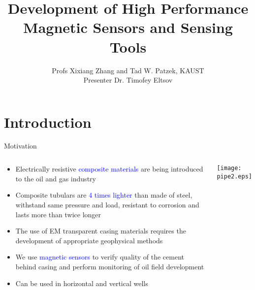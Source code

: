 \documentclass[aspectratio=169]{beamer}
\title[...]{Development of High Performance \\ Magnetic Sensors and Sensing Tools }
\author[Our authors]{Profs Xixiang Zhang and Tad W. Patzek, KAUST \\ Presenter Dr. Timofey Eltsov}
\begin{document}
    \begin{frame}[plain]
        \titlepage
    \end{frame}

    \section{Introduction}

\begin{frame}{Motivation}

\begin{columns}[c] 


    
\begin{small}
\begin{itemize}

\item Electrically resistive \textcolor{blue} {composite materials} are being introduced to the oil and gas industry
\item Composite tubulars are \textcolor{blue} {4 times lighter} than made of steel, withstand same pressure and load, resistant to corrosion and lasts more than twice longer
\item The use of EM transparent casing materials requires the development of appropriate geophysical methods
\item We use \textcolor{blue} {magnetic sensors} to verify quality of the cement behind casing and perform monitoring of oil field development
\item Can be used in horizontal and vertical wells

\end{itemize}
\end{small}

\texttt{[image: pipe2.eps]}
\centering

\vspace{0.5 cm}


\end{columns}
\end{frame}
\end{document}

